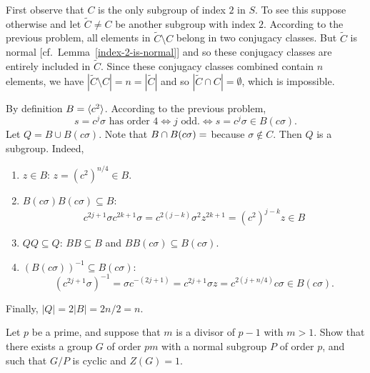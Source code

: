 \begin{solution} First observe that $C$ is the only subgroup of index $2$ in $S$. To see this suppose otherwise and let $\tilde C\ne C$ be another subgroup with index $2$. According to the previous problem, all elements in $\tilde C\setminus C$ belong in two conjugacy classes. But $\tilde C$ is normal [cf.~Lemma~\ref{index-2-is-normal}] and so these conjugacy classes are entirely included in $\tilde C$. Since these conjugacy classes combined contain $n$ elements, we have $|\tilde C\setminus C|=n=|\tilde C|$ and so $|\tilde C\cap C|=\emptyset$, which is impossible.

By definition $B=\langle c^2\rangle$. According to the previous problem,
$$
    s=c^j\sigma\text{ has order }4 \iff j \text{ odd.}\iff s=c^j\sigma\in B(c\sigma).
$$
Let $Q=B\cup B(c\sigma)$. Note that $B\cap B(c\sigma)=\empty$ because $\sigma\notin C$. Then $Q$ is a subgroup. Indeed,
\begin{enumerate}[-]
    \item $z\in B$: $z=(c^2)^{n/4}\in B$.
    \item $B(c\sigma)B(c\sigma)\subseteq B$:
    $$
        c^{2j+1}\sigma c^{2k+1}\sigma = c^{2(j-k)}\sigma^2z^{2k+1}
            = (c^2)^{j-k}z \in B
    $$
    \item $QQ\subseteq Q$: $BB\subseteq B$ and $BB(c\sigma)\subseteq B(c\sigma)$.
    \item $(B(c\sigma))^{-1}\subseteq B(c\sigma)$:
    $$
        (c^{2j+1}\sigma)^{-1}=\sigma c^{-(2j+1)}=c^{2j+1}\sigma z
        = c^{2(j+n/4)}c\sigma\in B(c\sigma).
    $$
\end{enumerate}
Finally, $|Q|=2|B|=2n/2=n$.  \end{solution}

\begin{probl}\label{problem-3.A.3}
    Let\/ $p$ be a prime, and suppose that\/ $m$ is a divisor of\/ $p-1$ with\/ $m>1$. Show that there exists a group\/ $G$ of order\/ $pm$ with a normal subgroup\/ $P$ of order\/ $p$, and such that\/ $G/P$ is cyclic and\/ $Z(G) = 1$.
\end{probl}

